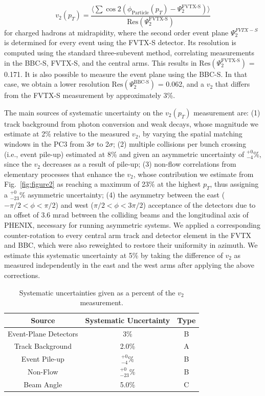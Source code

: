\documentclass[%
reprint,
showpacs,preprintnumbers,
 amsmath,amssymb,
 aps,
]{revtex4-1}
\newcommand{\pt}{\mbox{$p_T$}\xspace}
\begin{document}
\begin{equation}
v_{2}(p_{T}) = \frac{\langle\sum \cos 2(\phi_{\text{Particle}}(p_{T})-\Psi^{\text{FVTX-S}}_{2})\rangle}{\text{Res}(\Psi^{\text{FVTX-S}}_{2})}
\end{equation}
for charged hadrons at midrapidity, where the second order event plane $\Psi^{FVTX-S}_{2}$ is determined for every event using the FVTX-S detector. Its resolution is computed using the standard three-subevent method, correlating measurements in the BBC-S, FVTX-S, and the central arms. This results in $\text{Res}(\Psi^{\text{FVTX-S}}_{2})$ = 0.171. It is also possible to measure the event plane using the BBC-S. In that case, we obtain a lower resolution $\text{Res}(\Psi^{\text{BBC-S}}_{2})$ = 0.062, and a $v_2$ that differs from the FVTX-S measurement by approximately 3\%.

The main sources of systematic uncertainty on the $v_2(p_T)$ measurement are: (1) track background from photon conversion and weak decays, whose magnitude we estimate at 2\% relative to the measured $v_2$, by varying the spatial matching windows in the PC3 from 3$\sigma$ to 2$\sigma$; (2) multiple collisions per bunch crossing (i.e., event pile-up) estimated at 8\% and given an asymmetric uncertainty of $^{+0}_{-4}\%$, since the $v_2$ decreases as a result of pile-up; (3) non-flow correlations from elementary processes that enhance the $v_2$, whose contribution we estimate from Fig.~\ref{fig:figure2} as reaching a maximum of 23\% at the highest \pt, thus assigning a $^{+0}_{-23}\%$ asymmetric uncertainty; (4) the asymmetry between the east ($-\pi/2 < \phi < \pi/2$) and west ($\pi/2 < \phi < 3\pi/2$) acceptance of the detectors due to an offset of 3.6 mrad between the colliding beams and the longitudinal axis of PHENIX, necessary for running asymmetric systems. We applied a corresponding counter-rotation to every central arm track and detector element in the FVTX and BBC, which were also reweighted to restore their uniformity in azimuth. We estimate this systematic uncertainty at 5\% by taking the difference of $v_2$ as measured independently in the east and the west arms after applying the above corrections. 

\label{s:sys}
\begin{table}[htbp]
  \begin{center}
    \begin{tabular}{ccc}
      \hline
      \hline
      Source& Systematic Uncertainty & Type \\ \hline
      Event-Plane Detectors & 3\% & B\\
      Track Background &2.0\%& A\\
      Event Pile-up    &$^{+0}_{-4}\%$& B\\
      Non-Flow    &$^{+0}_{-23}\%$& B\\
      Beam Angle &5.0\%& C\\
    \hline
    \hline
    \end{tabular}
   \caption{\label{t:sys}Systematic uncertainties given as a percent of the $v_2$ measurement.}
   \end{center}
 \end{table}
\end{document}
